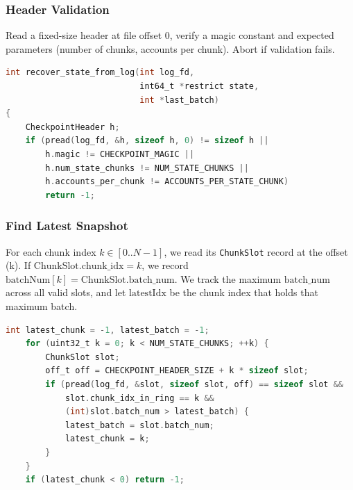 \documentclass[conference]{IEEEtran}
\begin{document}
\subsubsection*{Header Validation}
 Read a fixed-size header at file offset 0, verify a magic constant and expected parameters (number of chunks, accounts per chunk). Abort if validation fails.
\begin{lstlisting}[language=C]
int recover_state_from_log(int log_fd,
                           int64_t *restrict state,
                           int *last_batch)
{
    CheckpointHeader h;
    if (pread(log_fd, &h, sizeof h, 0) != sizeof h ||
        h.magic != CHECKPOINT_MAGIC ||
        h.num_state_chunks != NUM_STATE_CHUNKS ||
        h.accounts_per_chunk != ACCOUNTS_PER_STATE_CHUNK)
        return -1;
\end{lstlisting}

\subsubsection*{Find Latest Snapshot}
For each chunk index \(k\in[0..N{-}1]\), we read its \texttt{ChunkSlot} record at the offset (k). If \(\text{ChunkSlot.chunk\_idx} = k\), we record \(\text{batchNum}[k] = \text{ChunkSlot.batch\_num}\). We track the maximum \(\text{batch\_num}\) across all valid slots, and let \(\text{latestIdx}\) be the chunk index that holds that maximum batch.
\begin{lstlisting}[language=C]
    int latest_chunk = -1, latest_batch = -1;
    for (uint32_t k = 0; k < NUM_STATE_CHUNKS; ++k) {
        ChunkSlot slot;
        off_t off = CHECKPOINT_HEADER_SIZE + k * sizeof slot;
        if (pread(log_fd, &slot, sizeof slot, off) == sizeof slot &&
            slot.chunk_idx_in_ring == k &&
            (int)slot.batch_num > latest_batch) {
            latest_batch = slot.batch_num;
            latest_chunk = k;
        }
    }
    if (latest_chunk < 0) return -1;
\end{lstlisting}
\vspace{5 mm}
\end{document}
